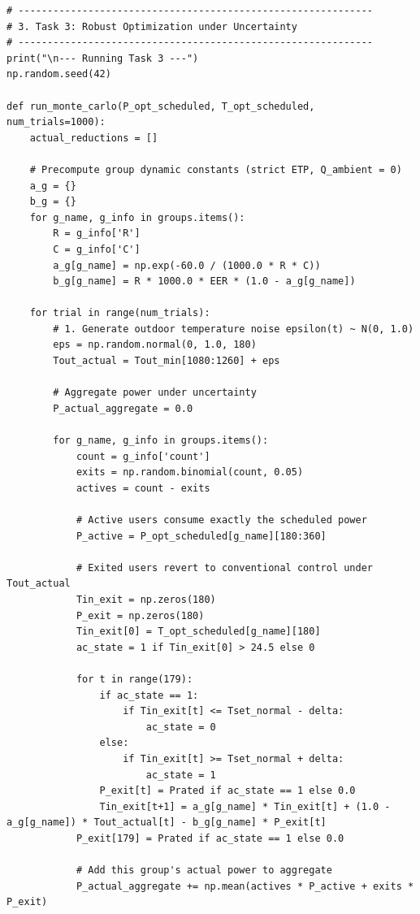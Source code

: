 \documentclass[12pt,a4paper]{article}
\begin{document}
\begin{lstlisting}
# -------------------------------------------------------------
# 3. Task 3: Robust Optimization under Uncertainty
# -------------------------------------------------------------
print("\n--- Running Task 3 ---")
np.random.seed(42)

def run_monte_carlo(P_opt_scheduled, T_opt_scheduled, num_trials=1000):
    actual_reductions = []
    
    # Precompute group dynamic constants (strict ETP, Q_ambient = 0)
    a_g = {}
    b_g = {}
    for g_name, g_info in groups.items():
        R = g_info['R']
        C = g_info['C']
        a_g[g_name] = np.exp(-60.0 / (1000.0 * R * C))
        b_g[g_name] = R * 1000.0 * EER * (1.0 - a_g[g_name])
        
    for trial in range(num_trials):
        # 1. Generate outdoor temperature noise epsilon(t) ~ N(0, 1.0)
        eps = np.random.normal(0, 1.0, 180)
        Tout_actual = Tout_min[1080:1260] + eps
        
        # Aggregate power under uncertainty
        P_actual_aggregate = 0.0
        
        for g_name, g_info in groups.items():
            count = g_info['count']
            exits = np.random.binomial(count, 0.05)
            actives = count - exits
            
            # Active users consume exactly the scheduled power
            P_active = P_opt_scheduled[g_name][180:360]
            
            # Exited users revert to conventional control under Tout_actual
            Tin_exit = np.zeros(180)
            P_exit = np.zeros(180)
            Tin_exit[0] = T_opt_scheduled[g_name][180]
            ac_state = 1 if Tin_exit[0] > 24.5 else 0
            
            for t in range(179):
                if ac_state == 1:
                    if Tin_exit[t] <= Tset_normal - delta:
                        ac_state = 0
                else:
                    if Tin_exit[t] >= Tset_normal + delta:
                        ac_state = 1
                P_exit[t] = Prated if ac_state == 1 else 0.0
                Tin_exit[t+1] = a_g[g_name] * Tin_exit[t] + (1.0 - a_g[g_name]) * Tout_actual[t] - b_g[g_name] * P_exit[t]
            P_exit[179] = Prated if ac_state == 1 else 0.0
            
            # Add this group's actual power to aggregate
            P_actual_aggregate += np.mean(actives * P_active + exits * P_exit)
            

\end{lstlisting}
\end{document}

